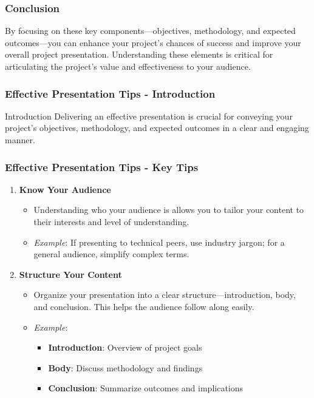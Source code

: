 \documentclass[aspectratio=169]{beamer}
\begin{document}
\begin{frame}[fragile]
    \frametitle{Conclusion}
    By focusing on these key components—objectives, methodology, and expected outcomes—you can enhance your project's chances of success and improve your overall project presentation. Understanding these elements is critical for articulating the project's value and effectiveness to your audience.
\end{frame}

\begin{frame}[fragile]
    \frametitle{Effective Presentation Tips - Introduction}
    \begin{block}{Introduction}
        Delivering an effective presentation is crucial for conveying your project's objectives, methodology, and expected outcomes in a clear and engaging manner. 
    \end{block}
\end{frame}

\begin{frame}[fragile]
    \frametitle{Effective Presentation Tips - Key Tips}
    \begin{enumerate}
        \item \textbf{Know Your Audience} \\
        \begin{itemize}
            \item Understanding who your audience is allows you to tailor your content to their interests and level of understanding.
            \item \textit{Example}: If presenting to technical peers, use industry jargon; for a general audience, simplify complex terms.
        \end{itemize}
        
        \item \textbf{Structure Your Content} \\
        \begin{itemize}
            \item Organize your presentation into a clear structure—introduction, body, and conclusion. This helps the audience follow along easily.
            \item \textit{Example}:
                \begin{itemize}
                    \item \textbf{Introduction}: Overview of project goals 
                    \item \textbf{Body}: Discuss methodology and findings 
                    \item \textbf{Conclusion}: Summarize outcomes and implications
                \end{itemize}
        \end{itemize}
    \end{enumerate}
\end{frame}
\end{document}
